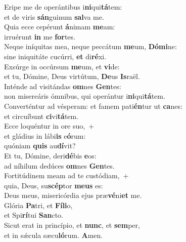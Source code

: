 \evenverse Eripe me de operántibus i\textbf{ni}qui\textbf{tá}tem:~\*\\
\evenverse et de viris \textbf{sán}guinum \textbf{sal}va me.\\
\oddverse Quia ecce cepérunt \textbf{á}nimam \textbf{me}am:~\*\\
\oddverse irruérunt \textbf{in} me \textbf{for}tes.\\
\evenverse Neque iníquitas mea, neque peccátum \textbf{me}um, \textbf{Dó}\textbf{mi}ne:~\*\\
\evenverse sine iniquitáte cucúrri, \textbf{et} di\textbf{ré}xi.\\
\oddverse Exsúrge in occúrsum \textbf{me}um, et \textbf{vi}de:~\*\\
\oddverse et tu, Dómine, Deus virtútum, \textbf{De}us \textbf{Is}raël.\\
\evenverse Inténde ad visitándas \textbf{om}nes \textbf{Gen}tes:~\*\\
\evenverse non misereáris ómnibus, qui operántur i\textbf{ni}qui\textbf{tá}tem.\\
\oddverse Converténtur ad vésperam: et famem pati\textbf{én}tur ut \textbf{ca}nes:~\*\\
\oddverse et circuíbunt \textbf{ci}vi\textbf{tá}tem.\\
\evenverse Ecce loquéntur in ore suo,~+\\
\evenverse  et gládius in lábi\textbf{is} e\textbf{ó}rum:~\*\\
\evenverse quóniam \textbf{quis} au\textbf{dí}vit?\\
\oddverse Et tu, Dómine, deri\textbf{dé}bis \textbf{e}os:~\*\\
\oddverse ad níhilum dedúces \textbf{om}nes \textbf{Gen}tes.\\
\evenverse Fortitúdinem meam ad te custódiam,~+\\
\evenverse  quia, Deus, su\textbf{scép}tor \textbf{me}\textbf{us} es:~\*\\
\evenverse Deus meus, misericórdia ejus præ\textbf{vé}ni\textbf{et} me.\\
\oddverse Glória \textbf{Pa}tri, et \textbf{Fí}\textbf{li}o,~\*\\
\oddverse et Spi\textbf{rí}tui \textbf{San}cto.\\
\evenverse Sicut erat in princípio, et \textbf{nunc}, et \textbf{sem}per,~\*\\
\evenverse et in sǽcula sæcu\textbf{ló}rum. \textbf{A}men.\\
